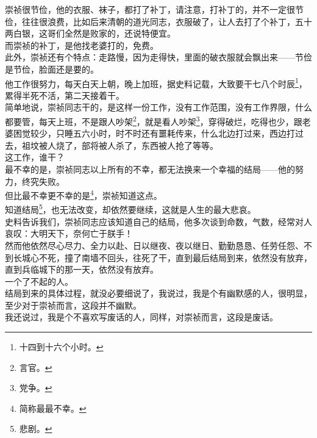 \begin{multicols}{\theparacolNo}
崇祯很节俭，他的衣服、袜子，都打了补丁，请注意，打补丁的，并不一定很节俭，往往很浪费，比如后来清朝的道光同志，衣服破了，让人去打了个补丁，五十两白银，这哥们全然是败家的，还说特便宜。\\

而崇祯的补丁，是他找老婆打的，免费。\\

此外，崇祯还有个特点：走路慢，因为走得快，里面的破衣服就会飘出来——节俭是节俭，脸面还是要的。\\

他工作很努力，每天白天上朝，晚上加班，据史料记载，大致要干七八个时辰\footnote{十四到十六个小时。}，累得半死不活，第二天接着干。\\

简单地说，崇祯同志干的，是这样一份工作，没有工作范围，没有工作界限，什么都要管，每天上班，不是跟人吵架\footnote{言官。}，就是看人吵架\footnote{党争。}，穿得破烂，吃得也少，跟老婆困觉较少，只睡五六小时，时不时还有噩耗传来，什么北边打过来，西边打过去，祖坟被人烧了，部将被人杀了，东西被人抢了等等。\\

这工作，谁干？\\

最不幸的是，崇祯同志以上所有的不幸，都无法换来一个幸福的结局——他的努力，终究失败。\\

但比最不幸更不幸的是\footnote{简称最最不幸。}，崇祯知道这点。\\

知道结局\footnote{悲剧。}，也无法改变，却依然要继续，这就是人生的最大悲哀。\\

史料告诉我们，崇祯同志应该知道自己的结局，他多次谈到命数，气数，经常对人哀叹：大明天下，奈何亡于朕手！\\

然而他依然尽心尽力、全力以赴、日以继夜、夜以继日、勤勤恳恳、任劳任怨、不到长城心不死，撞了南墙不回头，往死了干，直到最后结局到来，依然没有放弃，直到兵临城下的那一天，依然没有放弃。\\

一个了不起的人。\\

结局到来的具体过程，就没必要细说了，我说过，我是个有幽默感的人，很明显，至少对于崇祯而言，这段并不幽默。\\

我还说过，我是个不喜欢写废话的人，同样，对崇祯而言，这段是废话。\\


\end{multicols}

